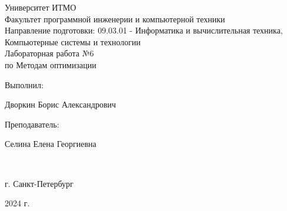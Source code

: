 \begin{center}
\hfill \break
\large{Университет ИТМО}\\
\large{Факультет программной инженерии и компьютерной техники}\\ 
\large{Направление подготовки: 09.03.01 - Информатика и вычислительная техника, Компьютерные системы и технологии}\\ 
\hfill\break
\hfill \break
\hfill \break
\hfill \break
\hfill \break
\hfill \break
\hfill \break
\hfill \break
\large{Лабораторная работа №6\\по Методам оптимизации\\}
\hfill \break
\hfill \break
\hfill \break
\hfill \break
\hfill \break
\end{center}
\hfill \break
\normalsize{ 
\begin{flushright}
Выполнил:
\par
Дворкин Борис Александрович
\par
Преподаватель:
\par
Селина Елена Георгиевна
\end{flushright}
}\\
\hfill \break
\hfill \break
\hfill \break
\hfill \break
\begin{center} г. Санкт-Петербург 
\par
2024 г. 
\end{center}
\thispagestyle{empty}
\thispagestyle{empty}